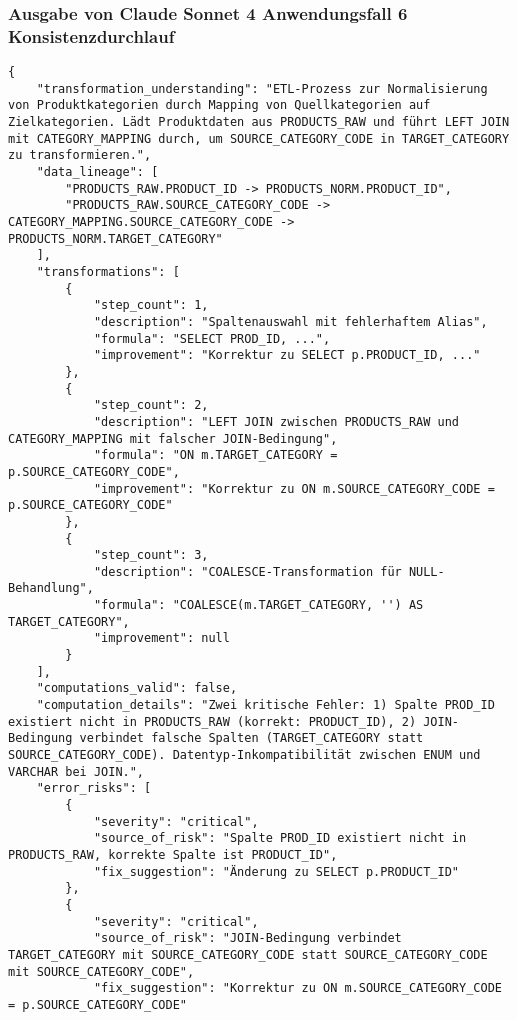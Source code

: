 \subsubsection{Ausgabe von Claude Sonnet 4 Anwendungsfall 6 Konsistenzdurchlauf}\label{anhang:subsubsec:claude_case6_prompt2}
\begin{lstlisting}[caption={Ausgabe: Claude Sonnet 4 Anwendungsfall 6 Konsistenzdurchlauf},label={claude_case6_prompt2}]
{
    "transformation_understanding": "ETL-Prozess zur Normalisierung von Produktkategorien durch Mapping von Quellkategorien auf Zielkategorien. Lädt Produktdaten aus PRODUCTS_RAW und führt LEFT JOIN mit CATEGORY_MAPPING durch, um SOURCE_CATEGORY_CODE in TARGET_CATEGORY zu transformieren.",
    "data_lineage": [
        "PRODUCTS_RAW.PRODUCT_ID -> PRODUCTS_NORM.PRODUCT_ID",
        "PRODUCTS_RAW.SOURCE_CATEGORY_CODE -> CATEGORY_MAPPING.SOURCE_CATEGORY_CODE -> PRODUCTS_NORM.TARGET_CATEGORY"
    ],
    "transformations": [
        {
            "step_count": 1,
            "description": "Spaltenauswahl mit fehlerhaftem Alias",
            "formula": "SELECT PROD_ID, ...",
            "improvement": "Korrektur zu SELECT p.PRODUCT_ID, ..."
        },
        {
            "step_count": 2,
            "description": "LEFT JOIN zwischen PRODUCTS_RAW und CATEGORY_MAPPING mit falscher JOIN-Bedingung",
            "formula": "ON m.TARGET_CATEGORY = p.SOURCE_CATEGORY_CODE",
            "improvement": "Korrektur zu ON m.SOURCE_CATEGORY_CODE = p.SOURCE_CATEGORY_CODE"
        },
        {
            "step_count": 3,
            "description": "COALESCE-Transformation für NULL-Behandlung",
            "formula": "COALESCE(m.TARGET_CATEGORY, '') AS TARGET_CATEGORY",
            "improvement": null
        }
    ],
    "computations_valid": false,
    "computation_details": "Zwei kritische Fehler: 1) Spalte PROD_ID existiert nicht in PRODUCTS_RAW (korrekt: PRODUCT_ID), 2) JOIN-Bedingung verbindet falsche Spalten (TARGET_CATEGORY statt SOURCE_CATEGORY_CODE). Datentyp-Inkompatibilität zwischen ENUM und VARCHAR bei JOIN.",
    "error_risks": [
        {
            "severity": "critical",
            "source_of_risk": "Spalte PROD_ID existiert nicht in PRODUCTS_RAW, korrekte Spalte ist PRODUCT_ID",
            "fix_suggestion": "Änderung zu SELECT p.PRODUCT_ID"
        },
        {
            "severity": "critical",
            "source_of_risk": "JOIN-Bedingung verbindet TARGET_CATEGORY mit SOURCE_CATEGORY_CODE statt SOURCE_CATEGORY_CODE mit SOURCE_CATEGORY_CODE",
            "fix_suggestion": "Korrektur zu ON m.SOURCE_CATEGORY_CODE = p.SOURCE_CATEGORY_CODE"

\end{lstlisting}
